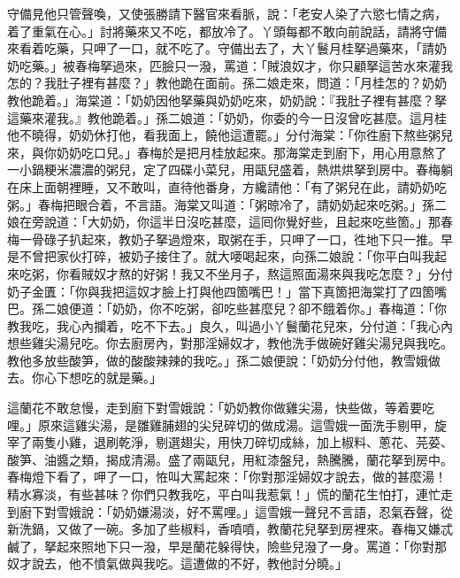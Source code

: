 守備見他只管聲喚，又使張勝請下醫官來看脈，說：「老安人染了六慾七情之病，着了重氣在心。」{}討將藥來又不吃，都放冷了。丫頭每都不敢向前說話，請將守備來看着吃藥，只呷了一口，就不吃了。{}守備出去了，大丫鬟月桂拏過藥來，「請奶奶吃藥。」被春梅拏過來，匹臉只一潑，罵道：「賊浪奴才，你只顧拏這苦水來灌我怎的？我肚子裡有甚麼？」教他跪在面前。孫二娘走來，問道：「月桂怎的？奶奶教他跪着。」海棠道：「奶奶因他拏藥與奶奶吃來，奶奶說：『我肚子裡有甚麼？拏這藥來灌我。』教他跪着。」孫二娘道：「奶奶，你委的今一日沒曾吃甚麼。這月桂他不曉得，奶奶休打他，看我面上，饒他這遭罷。」分付海棠：「你徃廚下熬些粥兒來，與你奶奶吃口兒。」春梅於是把月桂放起來。那海棠走到廚下，用心用意熬了一小鍋粳米濃濃的粥兒，定了四碟小菜兒，用甌兒盛着，熱烘烘拏到房中。春梅躺在床上面朝裡睡，又不敢叫，直待他番身，方纔請他：「有了粥兒在此，請奶奶吃粥。」春梅把眼合着，不言語。海棠又叫道：「粥晾冷了，請奶奶起來吃粥。」孫二娘在旁說道：「大奶奶，你這半日沒吃甚麼，這囘你覺好些，且起來吃些箇。」那春梅一骨碌子扒起來，教奶子拏過燈來，取粥在手，只呷了一口，徃地下只一推。{}早是不曾把家伙打碎，被奶子接住了。就大喓喝起來，向孫二娘說：「你平白叫我起來吃粥，你看賊奴才熬的好粥！我又不坐月子，熬這照面湯來與我吃怎麼？」分付奶子金匱：「你與我把這奴才臉上打與他四箇嘴巴！」當下真箇把海棠打了四箇嘴巴。孫二娘便道：「奶奶，你不吃粥，卻吃些甚麼兒？卻不餓着你。」春梅道：「你教我吃，我心內攔着，吃不下去。」良久，叫過小丫鬟蘭花兒來，分付道：「我心內想些雞尖湯兒吃。{}你去廚房內，對那淫婦奴才，教他洗手做碗好雞尖湯兒與我吃。教他多放些酸笋，做的酸酸辣辣的我吃。」{}孫二娘便說：「奶奶分付他，教雪娥做去。你心下想吃的就是藥。」

這蘭花不敢怠慢，走到廚下對雪娥說：「奶奶教你做雞尖湯，快些做，等着要吃哩。」{}原來這雞尖湯，是雛雞脯翅的尖兒碎切的做成湯。這雪娥一面洗手剔甲，旋宰了兩隻小雞，退刷乾淨，剔選翅尖，用快刀碎切成絲，加上椒料、蔥花、芫荽、酸笋、油醬之類，揭成清湯。盛了兩甌兒，用紅漆盤兒，熱騰騰，蘭花拏到房中。春梅燈下看了，呷了一口，恠叫大罵起來：「你對那淫婦奴才說去，做的甚麼湯！精水寡淡，有些甚味？你們只教我吃，平白叫我惹氣！」慌的蘭花生怕打，連忙走到廚下對雪娥說：「奶奶嫌湯淡，好不罵哩。」這雪娥一聲兒不言語，忍氣吞聲，從新洗鍋，又做了一碗。多加了些椒料，香噴噴，教蘭花兒拏到房裡來。春梅又嫌忒鹹了，拏起來照地下只一潑，早是蘭花躲得快，險些兒潑了一身。罵道：「你對那奴才說去，他不憤氣做與我吃。這遭做的不好，教他討分曉。」{}

